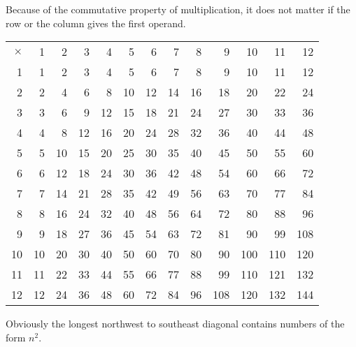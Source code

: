 \documentclass[12pt]{article}
\begin{document}
Because of the commutative property of multiplication, it does not matter if the row or the column gives the first operand.

\begin{tabular}{|r|r|r|r|r|r|r|r|r|r|r|r|r|}
$\times$ & 1 & 2 & 3 & 4 & 5 & 6 & 7 & 8 & 9 & 10 & 11 & 12 \\
1 & 1 & 2 & 3 & 4 & 5 & 6 & 7 & 8 & 9 & 10 & 11 & 12 \\
2 & 2 & 4 & 6 & 8 & 10 & 12 & 14 & 16 & 18 & 20 & 22 & 24 \\
3 & 3 & 6 & 9 & 12 & 15 & 18 & 21 & 24 & 27 & 30 & 33 & 36 \\
4 & 4 & 8 & 12 & 16 & 20 & 24 & 28 & 32 & 36 & 40 & 44 & 48 \\
5 & 5 & 10 & 15 & 20 & 25 & 30 & 35 & 40 & 45 & 50 & 55 & 60 \\
6 & 6 & 12 & 18 & 24 & 30 & 36 & 42 & 48 & 54 & 60 & 66 & 72 \\
7 & 7 & 14 & 21 & 28 & 35 & 42 & 49 & 56 & 63 & 70 & 77 & 84 \\
8 & 8 & 16 & 24 & 32 & 40 & 48 & 56 & 64 & 72 & 80 & 88 & 96 \\
9 & 9 & 18 & 27 & 36 & 45 & 54 & 63 & 72 & 81 & 90 & 99 & 108 \\
10 & 10 & 20 & 30 & 40 & 50 & 60 & 70 & 80 & 90 & 100 & 110 & 120 \\
11 & 11 & 22 & 33 & 44 & 55 & 66 & 77 & 88 & 99 & 110 & 121 & 132 \\
12 & 12 & 24 & 36 & 48 & 60 & 72 & 84 & 96 & 108 & 120 & 132 & 144 \\
\end{tabular}

Obviously the longest northwest to southeast diagonal contains numbers of the form $n^2$.
\end{document}
